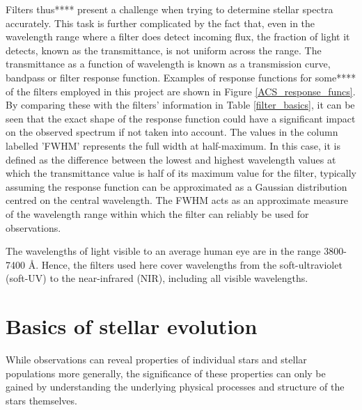 \documentclass[12pt, a4paper]{report}
\begin{document}
Filters thus**** present a challenge when trying to determine stellar spectra accurately. This task is further complicated by the fact that, even in the wavelength range where a filter does detect incoming flux, the fraction of light it detects, known as the transmittance, is not uniform across the range. The transmittance as a function of wavelength is known as a transmission curve, bandpass or filter response function. Examples of response functions for some**** of the filters employed in this project are shown in Figure \ref{ACS_response_funcs}. By comparing these with the filters' information in Table \ref{filter_basics}, it can be seen that the exact shape of the response function could have a significant impact on the observed spectrum if not taken into account.
The values in the column labelled 'FWHM' represents the full width at half-maximum. In this case, it is defined as the difference between the lowest and highest wavelength values at which the transmittance value is half of its maximum value for the filter, typically assuming the response function can be approximated as a Gaussian distribution centred on the central wavelength. The FWHM acts as an approximate measure of the wavelength range within which the filter can reliably be used for observations.

The wavelengths of light visible to an average human eye are in the range 3800-7400 \AA . Hence, the filters used here cover wavelengths from the soft-ultraviolet (soft-UV) to the near-infrared (NIR),  including all visible wavelengths.

\section{Basics of stellar evolution} \label{stel_evol}
While observations can reveal properties of individual stars and stellar populations more generally, the significance of these properties can only be gained by understanding the underlying physical processes and structure of the stars themselves.
\end{document}
